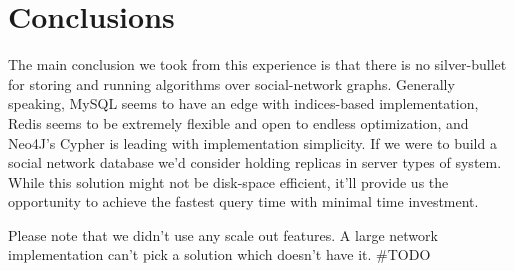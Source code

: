 \section{Conclusions}
The main conclusion we took from this experience is that there is no silver-bullet for storing and running algorithms over social-network graphs. Generally speaking, MySQL seems to have an edge with indices-based implementation, Redis seems to be extremely flexible and open to endless optimization, and Neo4J's Cypher is leading with implementation simplicity.
If we were to build a social network database we'd consider holding replicas in server types of system. While this solution might not be disk-space efficient, it'll provide us the opportunity to achieve the fastest query time with minimal time investment.

Please note that we didn't use any scale out features. A large network implementation can't pick a solution which doesn't have it. \#TODO
